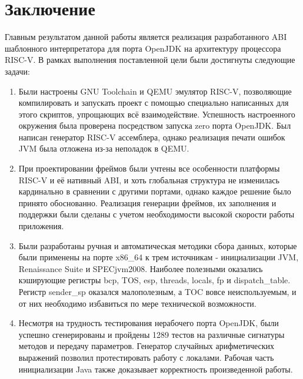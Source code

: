 \section*{Заключение}

Главным результатом данной работы является реализация разработанного ABI шаблонного интерпретатора для порта OpenJDK на архитектуру процессора RISC-V. В рамках выполнения поставленной цели были достигнуты следующие задачи:

\begin{enumerate}
    \item Были настроены GNU Toolchain и QEMU эмулятор RISC-V, позволяющие компилировать и запускать проект с помощью специально написанных для этого скриптов, упрощающих всё взаимодействие. Успешность настроенного окружения была проверена посредством запуска zero порта OpenJDK. Был написан генератор RISC-V ассемблера, однако реализация печати ошибок JVM была отложена из-за неполадок в QEMU.
    
    \item При проектировании фреймов были учтены все особенности платформы RISC-V и её нативный ABI, и хоть глобальная структура не изменилась кардинально в сравнении с другими портами, однако каждое решение было принято обоснованно. Реализация генерации фреймов, их заполнения и поддержки были сделаны с учетом необходимости высокой скорости работы приложения.
    
    \item Были разработаны ручная и автоматическая методики сбора данных, которые были применены на порте x86\_64 к трем источникам - инициализации JVM, Renaissance Suite и SPECjvm2008. Наиболее полезными оказались кэширующие регистры bcp, TOS, esp, threads, locals, fp и dispatch\_table. Регистр sender\_sp оказался малополезным, а TOC вовсе неиспользуемым, и от них необходимо избавиться по мере технической возможности.
    
    \item Несмотря на трудность тестирования нерабочего порта OpenJDK, были успешно сгенерированы и пройдены 1289 тестов на различные сигнатуры методов и передачу параметров. Генератор случайных арифметических выражений позволил протестировать работу с локалами. Рабочая часть инициализации Java также доказывает корректность произведенной работы.
\end{enumerate}

